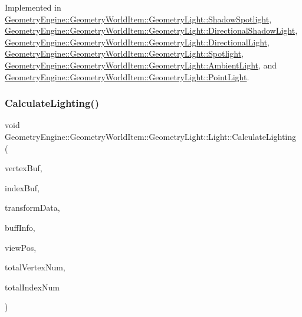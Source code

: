 Implemented in \mbox{\hyperlink{class_geometry_engine_1_1_geometry_world_item_1_1_geometry_light_1_1_shadow_spotlight_a27163f2f8903220d7eaae7aa70c9d6e6}{Geometry\+Engine\+::\+Geometry\+World\+Item\+::\+Geometry\+Light\+::\+Shadow\+Spotlight}}, \mbox{\hyperlink{class_geometry_engine_1_1_geometry_world_item_1_1_geometry_light_1_1_directional_shadow_light_a712d0b0a0573ebd246a4a8aa6b2b667a}{Geometry\+Engine\+::\+Geometry\+World\+Item\+::\+Geometry\+Light\+::\+Directional\+Shadow\+Light}}, \mbox{\hyperlink{class_geometry_engine_1_1_geometry_world_item_1_1_geometry_light_1_1_directional_light_af1eac6f1aac9388efe95e1a898cf600f}{Geometry\+Engine\+::\+Geometry\+World\+Item\+::\+Geometry\+Light\+::\+Directional\+Light}}, \mbox{\hyperlink{class_geometry_engine_1_1_geometry_world_item_1_1_geometry_light_1_1_spotlight_a6136ca2338a7b5f5be70ccab82fe655e}{Geometry\+Engine\+::\+Geometry\+World\+Item\+::\+Geometry\+Light\+::\+Spotlight}}, \mbox{\hyperlink{class_geometry_engine_1_1_geometry_world_item_1_1_geometry_light_1_1_ambient_light_a4f1d4fb9ad25626e15c28de03b610b4f}{Geometry\+Engine\+::\+Geometry\+World\+Item\+::\+Geometry\+Light\+::\+Ambient\+Light}}, and \mbox{\hyperlink{class_geometry_engine_1_1_geometry_world_item_1_1_geometry_light_1_1_point_light_aa30244fd20e61fdfe1ac1d85c99fd154}{Geometry\+Engine\+::\+Geometry\+World\+Item\+::\+Geometry\+Light\+::\+Point\+Light}}.

\mbox{\label{class_geometry_engine_1_1_geometry_world_item_1_1_geometry_light_1_1_light_abffc2b2ce5240b3c21b51020488dba10}} 
\subsubsection{\texorpdfstring{CalculateLighting()}{CalculateLighting()}}
{\footnotesize\ttfamily void Geometry\+Engine\+::\+Geometry\+World\+Item\+::\+Geometry\+Light\+::\+Light\+::\+Calculate\+Lighting (\begin{DoxyParamCaption}\item[{Q\+Open\+G\+L\+Buffer $\ast$}]{vertex\+Buf,  }\item[{Q\+Open\+G\+L\+Buffer $\ast$}]{index\+Buf,  }\item[{const \mbox{\hyperlink{class_geometry_engine_1_1_lighting_transformation_data}{Lighting\+Transformation\+Data}} \&}]{transform\+Data,  }\item[{const \mbox{\hyperlink{class_geometry_engine_1_1_buffers_info}{Buffers\+Info}} \&}]{buff\+Info,  }\item[{const Q\+Vector3D \&}]{view\+Pos,  }\item[{unsigned int}]{total\+Vertex\+Num,  }\item[{unsigned int}]{total\+Index\+Num }\end{DoxyParamCaption})\hspace{0.3cm}{\ttfamily [virtual]}}

